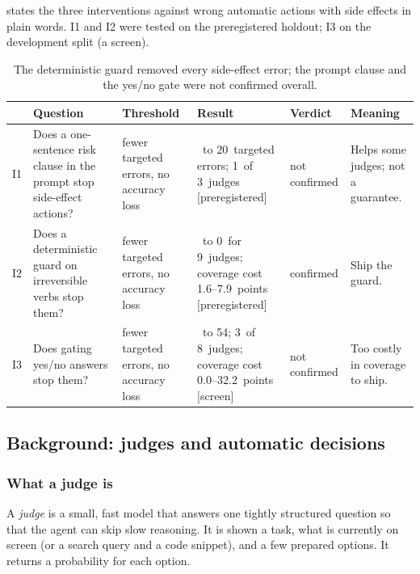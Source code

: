 \documentclass[11pt,letterpaper]{article}
\newcommand{\prereg}{\mbox{\textsf{\small\color{okblue}[preregistered]}}}
\newcommand{\term}[1]{\emph{#1}}
\newcommand{\screen}{\mbox{\textsf{\small\color{okgray}[screen]}}}
\newcommand{\IOneHoldAfter}{20}
\newcommand{\IOneHoldBefore}{22}
\newcommand{\IOneHoldConfirmed}{not confirmed}
\newcommand{\IOneHoldNApplicable}{3}
\newcommand{\IOneHoldNArmConfirmed}{1}
\newcommand{\IThreeDevAfter}{54}
\newcommand{\IThreeDevBefore}{159}
\newcommand{\IThreeDevConfirmed}{not confirmed}
\newcommand{\IThreeDevCovCostRange}{0.0--32.2}
\newcommand{\IThreeDevNApplicable}{8}
\newcommand{\IThreeDevNArmConfirmed}{3}
\newcommand{\ITwoHoldAfter}{0}
\newcommand{\ITwoHoldBefore}{38}
\newcommand{\ITwoHoldConfirmed}{confirmed}
\newcommand{\ITwoHoldCovCostRange}{1.6--7.9}
\newcommand{\ITwoHoldNApplicable}{9}
\begin{document}
 states the three interventions against wrong automatic actions with side effects in plain words. I1 and
I2 were tested on the preregistered holdout; I3 on the development split (a screen).

\begin{table}[tbp]
\centering\footnotesize
\caption{The deterministic guard removed every side-effect error; the prompt clause and the yes/no gate were not
confirmed overall.}
\label{tab:ehyp}
\begin{tabularx}{\textwidth}{@{}l >{\raggedright\arraybackslash}p{} >{\raggedright\arraybackslash}p{}
  >{\raggedright\arraybackslash}p{} >{\raggedright\arraybackslash}p{} >{\raggedright\arraybackslash}X@{}}
\toprule
 & Question & Threshold & Result & Verdict & Meaning \\
\midrule
I1 & Does a one-sentence risk clause in the prompt stop side-effect actions? & fewer targeted errors, no accuracy loss &
  \IOneHoldBefore\ to \IOneHoldAfter\ targeted errors; \IOneHoldNArmConfirmed\ of \IOneHoldNApplicable\ judges \prereg &
  \IOneHoldConfirmed & Helps some judges; not a guarantee. \\
I2 & Does a deterministic guard on irreversible verbs stop them? & fewer targeted errors, no accuracy loss &
  \ITwoHoldBefore\ to \ITwoHoldAfter\ for \ITwoHoldNApplicable\ judges; coverage cost \ITwoHoldCovCostRange\ points
  \prereg & \ITwoHoldConfirmed & Ship the guard. \\
I3 & Does gating yes/no answers stop them? & fewer targeted errors, no accuracy loss & \IThreeDevBefore\ to
  \IThreeDevAfter; \IThreeDevNArmConfirmed\ of \IThreeDevNApplicable\ judges; coverage cost \IThreeDevCovCostRange\ points
  \screen & \IThreeDevConfirmed & Too costly in coverage to ship. \\
\bottomrule
\end{tabularx}
\end{table}
\subsection{Background: judges and automatic decisions}\label{jb:sec:background}

\subsubsection{What a judge is}

A \term{judge} is a small, fast model that answers one tightly structured question so that the agent can
skip slow reasoning. It is shown a task, what is currently on screen (or a search query and a code
snippet), and a few prepared options. It returns a probability for each option.
\end{document}
